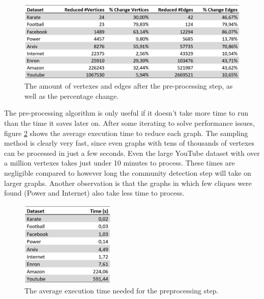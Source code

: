 \begin{figure}[H]
\begin{center}
\includegraphics[width=1\textwidth]{images/reducedtable.png}
\caption{The amount of vertexes and edges after the pre-processing step, as well as the percentage change.}\label{fig:reducedtable}
\end{center}
\end{figure}

The pre-processing algorithm is only useful if it doesn't take more time to run than the time it saves later on. After some iterating to solve performance issues, figure \ref{fig:prespeed} shows the average execution time to reduce each graph. The sampling method is clearly very fast, since even graphs with tens of thousands of vertexes can be processed in just a few seconds. Even the large YouTube dataset with over a million vertexes takes just under 10 minutes to process. These times are negligible compared to however long the community detection step will take on larger graphs. Another observation is that the graphs in which few cliques were found (Power and Internet) also take less time to process.

\begin{figure}[H]
\begin{center}
\includegraphics[width=0.4\textwidth]{images/prespeed.png}
\caption{The average execution time needed for the preprocessing step.}\label{fig:prespeed}
\end{center}
\end{figure}

